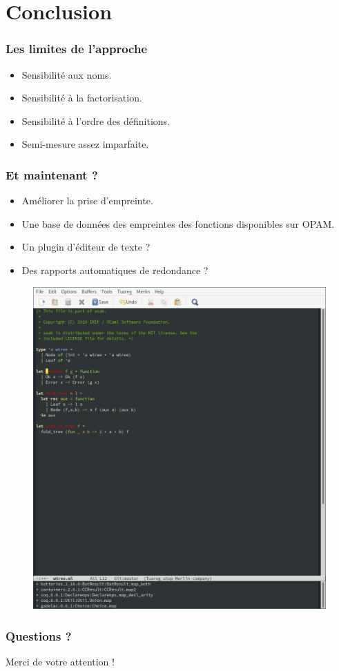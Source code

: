 \documentclass[11pt]{beamer}
\begin{document}
\section{Conclusion}
\begin{frame}
	\frametitle{Les limites de l'approche}
	\begin{itemize}
		\item Sensibilité aux noms.
		\item Sensibilité à la factorisation.
		\item Sensibilité à l'ordre des définitions.
		\item Semi-mesure assez imparfaite.
	\end{itemize}
\end{frame}

\begin{frame}
	\frametitle{Et maintenant ?}
\begin{multicols}{2}
	\begin{itemize}
		\item Améliorer la prise d'empreinte.
		\item Une base de données des empreintes des fonctions disponibles sur OPAM.
		\item Un plugin d'éditeur de texte ?
		\item Des rapports automatiques de redondance ?
	\end{itemize}
\begin{figure}
\includegraphics[scale=0.3]{anzad.png}
\end{figure}
\end{multicols}
\end{frame}

\begin{frame}
	\frametitle{Questions ?}
	\begin{center}
		Merci de votre attention !
	\end{center}
\end{frame}
\end{document}
